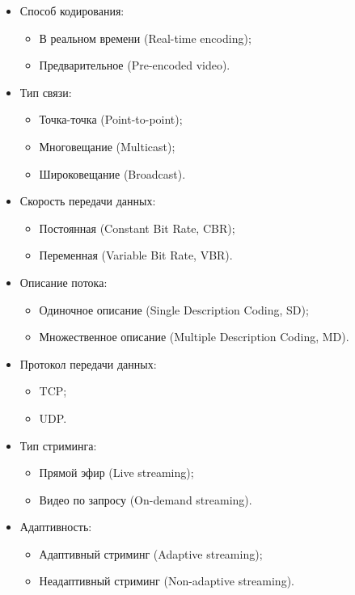 	\begin{itemize}[label=$\bullet$]
		\item Способ кодирования:
			\begin{itemize}[label=$\circ$]
				\item В реальном времени (Real-time encoding);
				\item Предварительное (Pre-encoded video).
			\end{itemize}
		\item Тип связи:
			\begin{itemize}[label=$\circ$]
				\item Точка-точка (Point-to-point);
				\item Многовещание (Multicast);
				\item Широковещание (Broadcast).
			\end{itemize}
		\item Скорость передачи данных:
			\begin{itemize}[label=$\circ$]
				\item Постоянная (Constant Bit Rate, CBR);
				\item Переменная (Variable Bit Rate, VBR).
			\end{itemize}
		\item Описание потока:
			\begin{itemize}[label=$\circ$]
				\item Одиночное описание (Single Description Coding, SD);
				\item Множественное описание (Multiple Description Coding, MD).
			\end{itemize}
		\item Протокол передачи данных:
			\begin{itemize}[label=$\circ$]
				\item TCP;
				\item UDP.
			\end{itemize}
		\item Тип стриминга:
			\begin{itemize}[label=$\circ$]
				\item Прямой эфир (Live streaming);
				\item Видео по запросу (On-demand streaming).
			\end{itemize}
		\item Адаптивность:
			\begin{itemize}[label=$\circ$]
				\item Адаптивный стриминг (Adaptive streaming);
				\item Неадаптивный стриминг (Non-adaptive streaming).
			\end{itemize}
	\end{itemize}
	
